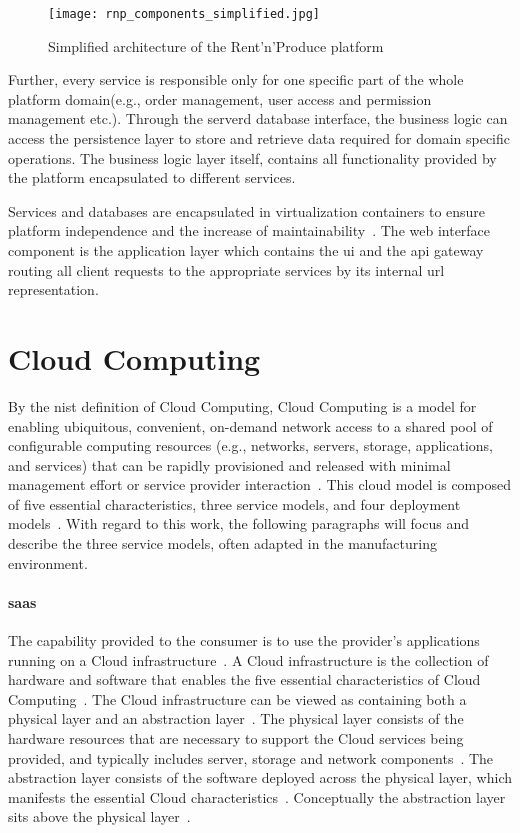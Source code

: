 \documentclass[
a4paper,
twoside,
headsepline,
cleardoublepage=empty,
parskip=half,
draft=false
]{scrbook}
\begin{document}
			\begin{figure}[htbp]
				\centering
				\texttt{[image: rnp\_components\_simplified.jpg]}
				\caption{Simplified architecture of the Rent'n'Produce platform}
				\label{fig:rnp_architecture}
			\end{figure}

			Further, every service is responsible only for one specific part of the whole platform domain(e.g., order management, user access and permission management etc.).
			Through the serverd database interface, the business logic can access the persistence layer to store and retrieve data required for domain specific operations.
			The business logic layer itself, contains all functionality provided by the platform encapsulated to different services.

			Services and databases are encapsulated in virtualization containers to ensure platform independence and the increase of maintainability~\cite{xen.17b}.
			The web interface component is the application layer which contains the \gls{ui} and the \gls{api} gateway routing all client requests to the appropriate services by its internal \gls{url} representation.

		\section{Cloud Computing}\label{sec:cloud_computing}

			By the \gls{nist} definition of Cloud Computing, Cloud Computing is a model for enabling ubiquitous, convenient, on-demand network access to a shared pool of configurable computing resources (e.g., networks, servers, storage, applications, and services) that can be rapidly provisioned and released with minimal management effort or service provider interaction~\cite{mell2011nist}.
			This cloud model is composed of five essential characteristics, three service models, and four deployment
			models~\cite{fehling2014cloud}. 
			With regard to this work, the following paragraphs will focus and describe the three service models, often adapted in the manufacturing environment.

			\paragraph{\gls{saas}} The capability provided to the consumer is to use the provider's applications running on a Cloud infrastructure~\cite{mell2011nist}.
			A Cloud infrastructure is the collection of hardware and software that enables the five essential characteristics of Cloud Computing~\cite{mell2011nist}. 
			The Cloud infrastructure can be viewed as containing both a physical layer and an abstraction layer~\cite{fehling2014cloud}. 
			The physical layer consists of the hardware resources that are necessary to support the Cloud services being provided, and typically includes server, storage and network components~\cite{fehling2014cloud}.
			The abstraction layer consists of the software deployed across the physical layer, which manifests the essential Cloud characteristics~\cite{fehling2014cloud}. 
			Conceptually the abstraction layer sits above the physical layer~\cite{fehling2014cloud}.
			
\end{document}
